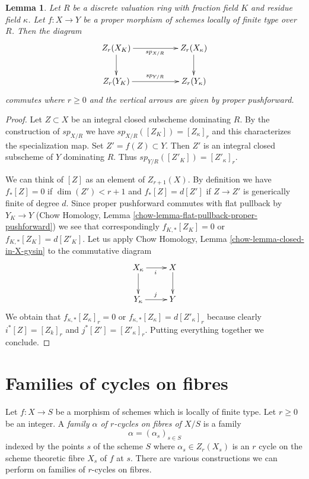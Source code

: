 \documentclass{stacks-project}
\theoremstyle{plain}
\newtheorem{lemma}[subsection]{Lemma}
\theoremstyle{definition}
\theoremstyle{remark}
\numberwithin{equation}{subsection}
\begin{document}
\begin{lemma}
\label{lemma-specialization-proper-pushforward}
Let $R$ be a discrete valuation ring with fraction field $K$ and residue field
$\kappa$. Let $f : X \to Y$ be a proper morphism of schemes locally of
finite type over $R$. Then the diagram
$$
\xymatrix{
Z_r(X_K) \ar[rr]_{sp_{X/R}} \ar[d] & & Z_r(X_\kappa) \ar[d] \\
Z_r(Y_K) \ar[rr]^{sp_{Y/R}} & & Z_r(Y_\kappa)
}
$$
commutes where $r \geq 0$ and the vertical arrows are given
by proper pushforward.
\end{lemma}

\begin{proof}
Let $Z \subset X$ be an integral closed subscheme dominating $R$.
By the construction of $sp_{X/R}$ we have $sp_{X/R}([Z_K]) = [Z_\kappa]_r$
and this characterizes the specialization map.
Set $Z' = f(Z) \subset Y$. Then $Z'$ is an integral closed subscheme
of $Y$ dominating $R$. Thus $sp_{Y/R}([Z'_K]) = [Z'_\kappa]_r$.

\medskip\noindent
We can think of $[Z]$ as an element of $Z_{r + 1}(X)$. By definition
we have $f_*[Z] = 0$ if $\dim(Z') < r + 1$ and $f_*[Z] = d[Z']$
if $Z \to Z'$ is generically finite of degree $d$.
Since proper pushforward commutes with flat pullback by $Y_K \to Y$
(Chow Homology, Lemma \ref{chow-lemma-flat-pullback-proper-pushforward})
we see that correspondingly $f_{K, *}[Z_K] = 0$ or $f_{K, *}[Z_K] = d[Z'_K]$.
Let us apply Chow Homology, Lemma \ref{chow-lemma-closed-in-X-gysin} to
the commutative diagram
$$
\xymatrix{
X_\kappa \ar[d] \ar[r]_i & X \ar[d] \\
Y_\kappa \ar[r]^j & Y
}
$$
We obtain that $f_{\kappa, *}[Z_\kappa]_r = 0$ or
$f_{\kappa, *}[Z_\kappa] = d[Z'_\kappa]_r$ because
clearly $i^*[Z] = [Z_k]_r$ and $j^*[Z'] = [Z'_\kappa]_r$.
Putting everything together we conclude.
\end{proof}









\section{Families of cycles on fibres}
\label{section-cycles-fibres}

\noindent
Let $f : X \to S$ be a morphism of schemes which is locally of finite type.
Let $r \geq 0$ be an integer. A
{\it family $\alpha$ of $r$-cycles on fibres of $X/S$} is a family
$$
\alpha = (\alpha_s)_{s \in S}
$$
indexed by the points $s$ of the scheme $S$ where $\alpha_s \in Z_r(X_s)$
is an $r$ cycle on the scheme theoretic fibre $X_s$ of $f$ at $s$.
There are various constructions we can perform on families of
$r$-cycles on fibres.
\end{document}
